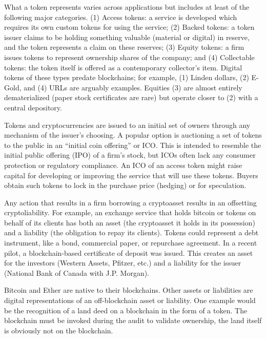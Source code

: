 What a token represents varies across applications but includes at least of the following major categories. (1) Access tokens: a service is developed which requires its own custom tokens for using the service; (2) Backed tokens: a token issuer claims to be holding something valuable (material or digital) in reserve, and the token represents a claim on these reserves; (3) Equity tokens: a firm issues tokens to represent ownership shares of the company; and (4) Collectable tokens: the token itself is offered as a contemporary collector’s item. Digital tokens of these types predate blockchains; for example, (1) Linden dollars, (2) E-Gold, and (4) URLs are arguably examples. Equities (3) are almost entirely dematerialized (\eg paper stock certificates are rare) but operate closer to (2) with a central depository.

Tokens and cryptocurrencies are issued to an initial set of owners through any mechanism of the issuer’s choosing. A popular option is auctioning a set of tokens to the public in an ``initial coin offering'' or ICO. This is intended to resemble the initial public offering (IPO) of a firm’s stock, but ICOs often lack any consumer protection or regulatory compliance. An ICO of an access token might raise capital for developing or improving the service that will use these tokens. Buyers obtain such tokens to lock in the purchase price (hedging) or for speculation. 

Any action that results in a firm borrowing a cryptoasset results in an offsetting cryptoliability. For example, an exchange service that holds bitcoin or tokens on behalf of its clients has both an asset (the cryptoasset it holds in its possession) and a liability (the obligation to repay its clients). Tokens could represent a debt instrument, like a bond, commercial paper, or repurchase agreement. In a recent pilot, a blockchain-based certificate of deposit was issued. This creates an asset for the investors (Western Assets, Pfitzer, etc.) and a liability for the issuer (National Bank of Canada with J.P. Morgan). 

Bitcoin and Ether are native to their blockchains. Other assets or liabilities are digital representations of an off-blockchain asset or liability. One example would be the recognition of a land deed on a blockchain in the form of a token. The blockchain must be invoked during the audit to validate ownership, the land itself is obviously not on the blockchain.

